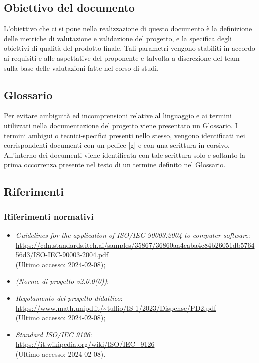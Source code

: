 \subsection{Obiettivo del documento}
L'obiettivo che ci si pone nella realizzazione di questo documento è la definizione delle metriche di valutazione e validazione del progetto, e la specifica degli obiettivi di qualità del prodotto finale. Tali parametri vengono stabiliti in accordo ai requisiti e 
alle aspettative del proponente e talvolta a discrezione del team sulla base delle valutazioni fatte nel corso di studi.

\subsection{Glossario}
Per evitare ambiguità ed incomprensioni relative al linguaggio e ai termini utilizzati nella documentazione del progetto viene presentato un Glossario.
I termini ambigui o tecnici-specifici presenti nello stesso, vengono identificati nei corrispondenti documenti con un pedice |g| e con una scrittura in corsivo.
All'interno dei documenti viene identificata con tale scrittura solo e soltanto la prima occorrenza presente nel testo di un termine definito nel Glossario.

\subsection{Riferimenti}
   \subsubsection{Riferimenti normativi}
   \begin{itemize}
    \item \textit{Guidelines for the application of ISO/IEC 90003:2004 to computer software}: \\
        \url{https://cdn.standards.iteh.ai/samples/35867/36860aa4caba4c84b26051db576456d3/ISO-IEC-90003-2004.pdf}\\
        (Ultimo accesso: 2024-02-08);
    \item \textit{(Norme di progetto v2.0.0(0))};
    \item \textit{Regolamento del progetto didattico}: \\
        \url{https://www.math.unipd.it/~tullio/IS-1/2023/Dispense/PD2.pdf}\\
        (Ultimo accesso: 2024-02-08);
    \item \textit{Standard ISO/IEC 9126}:\\
        \url{https://it.wikipedia.org/wiki/ISO/IEC_9126}\\
        (Ultimo accesso: 2024-02-08).
    \end{itemize}
    
